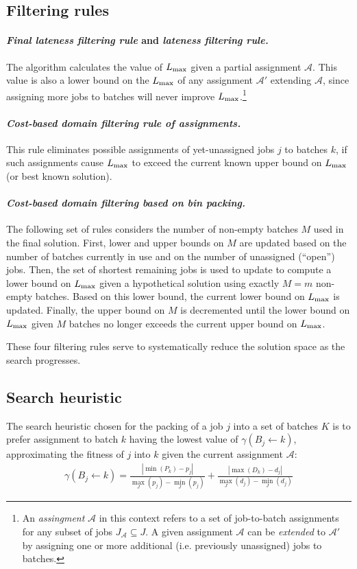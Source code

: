 \documentclass[13pt, letterpaper, oneside]{book}
\begin{document}
\subsection{Filtering rules}
\paragraph{\textit{Final lateness filtering rule} and \textit{lateness filtering
rule.}} The algorithm calculates the value
of $L_{\text{max}}$ given a partial assignment $\mathcal{A}$. This value is also a lower
bound on the $L_{\text{max}}$ of any assignment $\mathcal{A}'$ extending $\mathcal{A}$,
since assigning more jobs to batches will never improve $L_{\text{max}}$.\footnote{An
\textit{assingment} $\mathcal{A}$ in this context refers to a set of
job-to-batch assignments for any subset of jobs $J_\mathcal{A} \subseteq J$. A
given assignment $\mathcal{A}$ can be \textit{extended} to $\mathcal{A}'$ by
assigning one or more additional (i.e.  previously unassigned) jobs to batches.}

\paragraph{\textit{Cost-based domain filtering rule of assignments.}} This rule
eliminates possible assignments of yet-unassigned jobs $j$ to batches $k$, if
such assignments cause $L_{\text{max}}$ to exceed the current known upper bound on
$L_{\text{max}}$ (or best known solution).

\paragraph{\textit{Cost-based domain filtering based on bin packing.}} The
following set of rules considers the number of non-empty batches $M$ used in the
final solution. First, lower and upper bounds on $M$ are updated based on the
number of batches currently in use and on the number of unassigned (``open'')
jobs. Then, the set of shortest remaining jobs is used to update to compute a
lower bound on $L_{\text{max}}$ given a hypothetical solution using exactly $M = m$
non-empty batches. Based on this lower bound, the current lower bound on
$L_{\text{max}}$ is updated. Finally, the upper bound on $M$ is decremented until the
lower bound on $L_{\text{max}}$ given $M$ batches no longer exceeds the current upper
bound on $L_{\text{max}}$.

These four filtering rules serve to systematically reduce the solution space as
the search progresses.

\subsection{Search heuristic}
\label{sec:bestfit}
The search heuristic chosen for the packing of a job $j$ into a set of batches
$K$ is to prefer assignment to batch $k$ having the lowest value of $\gamma(B_j
\leftarrow k)$, approximating the fitness of $j$ into $k$ given the current
assignment $\mathcal{A}$:
\begin{align}
\gamma(B_j \leftarrow k) = \frac{ |\min(P_k) - p_j| }{\underset{J}{\max}(p_j) -
\underset{J}{\min}(p_j)} + \frac{ |\max(D_k) - d_j| }{\underset{J}{\max}(d_j) -
\underset{J}{\min}(d_j)}
\end{align}
\end{document}
